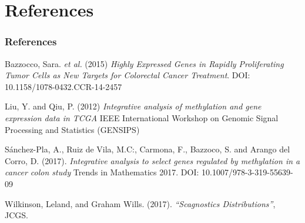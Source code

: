 \documentclass[handout]{beamer}
\begin{document}
\section*{References}
\begin{frame}\frametitle{References}
\begin{thebibliography}{9}

%




 Bazzocco, Sara. \emph{et al.} (2015) \emph{Highly Expressed Genes in Rapidly Proliferating Tumor Cells as New Targets for Colorectal Cancer Treatment}. DOI: 10.1158/1078-0432.CCR-14-2457

 Liu, Y. and Qiu, P. (2012) \emph{Integrative analysis of methylation and gene expression data in TCGA} IEEE International Workshop on Genomic Signal Processing and Statistics (GENSIPS)

 Sánchez-Pla, A., Ruiz de Vila, M.C:, Carmona, F., Bazzoco, S. and Arango del Corro, D. (2017). 
\emph{Integrative analysis to select genes regulated by methylation in a cancer colon study} Trends in Mathematics 2017. DOI: 10.1007/978-3-319-55639-09

 Wilkinson, Leland, and Graham Wills. (2017). 
\emph{``Scagnostics Distributions''}, JCGS.

\end{thebibliography}

\end{frame}
\end{document}
